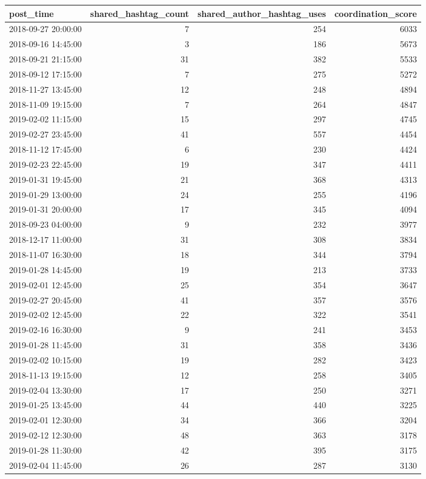 \begin{tabular}{lrrr}
\toprule
post\_time & shared\_hashtag\_count & shared\_author\_hashtag\_uses & coordination\_score \\
\midrule
2018-09-27 20:00:00 & 7 & 254 & 6033 \\
2018-09-16 14:45:00 & 3 & 186 & 5673 \\
2018-09-21 21:15:00 & 31 & 382 & 5533 \\
2018-09-12 17:15:00 & 7 & 275 & 5272 \\
2018-11-27 13:45:00 & 12 & 248 & 4894 \\
2018-11-09 19:15:00 & 7 & 264 & 4847 \\
2019-02-02 11:15:00 & 15 & 297 & 4745 \\
2019-02-27 23:45:00 & 41 & 557 & 4454 \\
2018-11-12 17:45:00 & 6 & 230 & 4424 \\
2019-02-23 22:45:00 & 19 & 347 & 4411 \\
2019-01-31 19:45:00 & 21 & 368 & 4313 \\
2019-01-29 13:00:00 & 24 & 255 & 4196 \\
2019-01-31 20:00:00 & 17 & 345 & 4094 \\
2018-09-23 04:00:00 & 9 & 232 & 3977 \\
2018-12-17 11:00:00 & 31 & 308 & 3834 \\
2018-11-07 16:30:00 & 18 & 344 & 3794 \\
2019-01-28 14:45:00 & 19 & 213 & 3733 \\
2019-02-01 12:45:00 & 25 & 354 & 3647 \\
2019-02-27 20:45:00 & 41 & 357 & 3576 \\
2019-02-02 12:45:00 & 22 & 322 & 3541 \\
2019-02-16 16:30:00 & 9 & 241 & 3453 \\
2019-01-28 11:45:00 & 31 & 358 & 3436 \\
2019-02-02 10:15:00 & 19 & 282 & 3423 \\
2018-11-13 19:15:00 & 12 & 258 & 3405 \\
2019-02-04 13:30:00 & 17 & 250 & 3271 \\
2019-01-25 13:45:00 & 44 & 440 & 3225 \\
2019-02-01 12:30:00 & 34 & 366 & 3204 \\
2019-02-12 12:30:00 & 48 & 363 & 3178 \\
2019-01-28 11:30:00 & 42 & 395 & 3175 \\
2019-02-04 11:45:00 & 26 & 287 & 3130 \\

\end{tabular}
